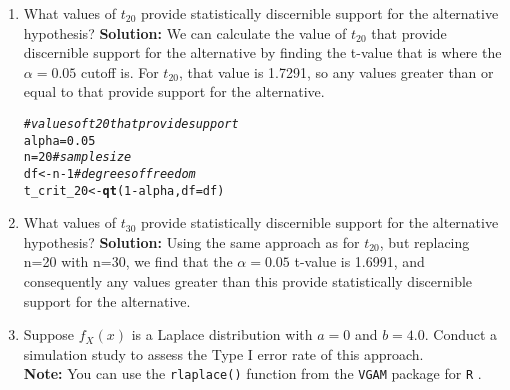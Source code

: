 \documentclass{article}\usepackage[]{graphicx}\usepackage[]{xcolor}
\makeatletter
\newcommand{\hlnum}[1]{\textcolor[rgb]{0.686,0.059,0.569}{#1}}%
\newcommand{\hlcom}[1]{\textcolor[rgb]{0.678,0.584,0.686}{\textit{#1}}}%
\newcommand{\hlopt}[1]{\textcolor[rgb]{0,0,0}{#1}}%
\newcommand{\hldef}[1]{\textcolor[rgb]{0.345,0.345,0.345}{#1}}%
\newcommand{\hlkwb}[1]{\textcolor[rgb]{0.69,0.353,0.396}{#1}}%
\newcommand{\hlkwc}[1]{\textcolor[rgb]{0.333,0.667,0.333}{#1}}%
\newcommand{\hlkwd}[1]{\textcolor[rgb]{0.737,0.353,0.396}{\textbf{#1}}}%
\newenvironment{kframe}{%
 \def\at@end@of@kframe{}%
 \ifinner\ifhmode%
  \def\at@end@of@kframe{\end{minipage}}%
  \begin{minipage}{\columnwidth}%
 \fi\fi%
 \def\FrameCommand##1{\hskip\@totalleftmargin \hskip-\fboxsep
 \colorbox{shadecolor}{##1}\hskip-\fboxsep
     \hskip-\linewidth \hskip-\@totalleftmargin \hskip\columnwidth}%
 \MakeFramed {\advance\hsize-\width
   \@totalleftmargin\z@ \linewidth\hsize
   \@setminipage}}%
 {\par\unskip\endMakeFramed%
 \at@end@of@kframe}
\newenvironment{knitrout}{}{} %
\makeatother
\begin{document}
\begin{enumerate}
\begin{enumerate}
  \item What values of $t_{20}$ provide statistically discernible support for the
  alternative hypothesis?
  \textbf{Solution:} We can calculate the value of $t_{20}$ that provide discernible support for the alternative by finding the t-value that is where the $\alpha = 0.05$ cutoff is. For $t_{20}$, that value is 1.7291, so any values greater than or equal to that provide support for the alternative.
\begin{knitrout}\scriptsize
{}\color{fgcolor}\begin{kframe}
\begin{alltt}
\hlcom{#values of t20 that provide support}
\hldef{alpha} \hlkwb{=} \hlnum{0.05}
\hldef{n} \hlkwb{=} \hlnum{20}  \hlcom{# sample size}
\hldef{df} \hlkwb{<-} \hldef{n} \hlopt{-} \hlnum{1}  \hlcom{# degrees of freedom}
\hldef{t_crit_20} \hlkwb{<-} \hlkwd{qt}\hldef{(}\hlnum{1} \hlopt{-} \hldef{alpha,} \hlkwc{df} \hldef{= df)}
\end{alltt}
\end{kframe}
\end{knitrout}
  \item What values of $t_{30}$ provide statistically discernible support for the
  alternative hypothesis?
  \textbf{Solution:} Using the same approach as for $t_{20}$, but replacing n=20 with n=30, we find that the $\alpha = 0.05$ t-value is 1.6991, and consequently any values greater than this provide statistically discernible support for the alternative.
  \item Suppose $f_X(x)$ is a Laplace distribution with $a=0$ and $b=4.0$.
  Conduct a simulation study to assess the Type I error rate of this approach.\\
  \textbf{Note:} You can use the \texttt{rlaplace()} function from the \texttt{VGAM}
  package for \texttt{R} \citep{VGAM}.
  

\end{enumerate}
\end{enumerate}
\end{document}
